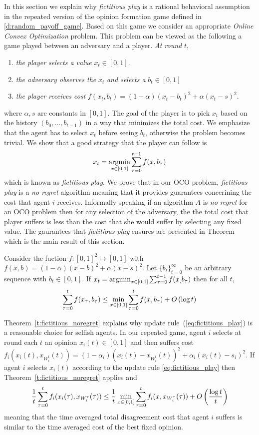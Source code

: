 \noindent In this section we explain why \emph{fictitious play} is a rational behavioral assumption in
the repeated version of the opinion formation game defined in \ref{d:random_payoff_game}. Based on this 
game we consider an appropriate \emph{Online Convex Optimization} problem. This problem can be viewed 
as the following a game played between an adversary and a player. \emph{At round }$t$,
\begin{enumerate}
  \item \emph{the player selects a value }$x_t \in [0,1]$.
  \item \emph{the adversary observes the }$x_t$ \emph{and selects a} $b_t \in [0,1]$
  \item \emph{the player receives cost} $f(x_t,b_t)=(1-\alpha)(x_t-b_t)^2 + \alpha(x_t -s)^2$.
\end{enumerate}
where $\alpha,s$ are constants in $[0,1]$. The goal of the player is to pick $x_t$ based on the history
$(b_0,\ldots,b_{t-1})$ in a way that minimizes the total cost. We emphasize
that the agent has to select $x_t$ before seeing $b_t$, otherwise the
problem becomes trivial. We show that a good strategy that the player can follow is 
\[x_t = \operatorname*{argmin}_{x \in [0,1]}\sum_{\tau=0}^{t-1}f(x,b_\tau)\]
which is known as \emph{fictitious play}. We prove that in our OCO problem,
\emph{fictitious play} is a \emph{no-regret} algorithm meaning that
it provides guarantees concerining the cost that agent $i$ receives. Informally speaking
if an algorithm $A$ is \emph{no-regret} for an OCO problem then for any selection of the
adversary, the the total cost that player suffers is less than 
the cost that she would suffer by selecting any fixed value. The gaurantees that \emph{fictitious play} 
ensures are presented in Theorem~\label{t:fictitious_noregret} which is the main result of this section.
\begin{theorem}\label{t:fictitious_noregret}
Consider the fuction $f:[0,1]^2 \mapsto [0,1]$ with $f(x,b) = (1-\alpha)(x-b)^2 + \alpha(x-s)^2$.
Let $\{b_t\}_{t=0}^\infty$ be an arbitrary sequence with $b_t \in [0,1]$. If $x_t = \operatorname*{argmin}_{x \in [0,1]}\sum_{\tau=0}^{t-1}f(x_,b_\tau)$
then for all $t$, 
\[\sum_{\tau=0}^{t}f(x_\tau,b_\tau) \leq \min_{x \in [0,1]}\sum_{\tau=0}^tf(x,b_\tau) + O\left(\log t\right)\]
\end{theorem}

Theorem~\ref{t:fictitious_noregret} explains why update rule~(\ref{eq:fictitious_play}) is a
reasonable choice for selfish agents. In our repeated game, agent $i$ selects at round each $t$ an opinion
$x_i(t)\in [0,1]$ and then suffers cost $f_i(x_i(t),x_{W_i^t}(t))=(1-\alpha_i)(x_i(t)-x_{W_i^t}(t))^2+\alpha_i(x_i(t)-s_i)^2$. 
If agent $i$ selects $x_i(t)$ according  to the update rule \ref{eq:fictitious_play} then Theorem~\ref{t:fictitious_noregret}
applies and\[\frac{1}{t}\sum_{\tau=0}^t f_i(x_i(\tau),x_{W_i^\tau}(\tau)) \leq
\frac{1}{t}\min_{x \in [0,1]}\sum_{\tau=0}^tf_i(x,x_{W_i^\tau}(\tau)) + O\left(\frac{\log t}{t}\right)\]
meaning that the time averaged total disagreement cost that agent $i$ suffers is similar to the 
time averaged cost of the best fixed opinion.

